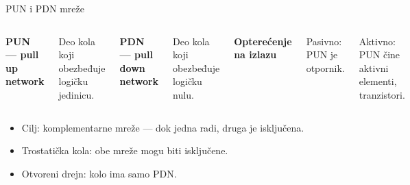 \begin{frame}[label=09_1-s009]{PUN i PDN mreže}\setlength{\parskip}{2pt}\setlength{\abovedisplayskip}{4pt}\setlength{\belowdisplayskip}{4pt}\setlength{\abovedisplayshortskip}{3pt}\setlength{\belowdisplayshortskip}{3pt}
\begin{columns}[T,onlytextwidth]\centering {}\textbf{PUN — pull up network}\par Deo kola koji obezbeđuje logičku jedinicu.
\medskip\par\textbf{PDN — pull down network}\par Deo kola koji obezbeđuje logičku nulu.
\medskip\par\textbf{Opterećenje na izlazu}\par Pasivno: PUN je otpornik.\par Aktivno: PUN čine aktivni elementi, tranzistori.\end{columns}\medskip
\begin{itemize}
\item Cilj: komplementarne mreže — dok jedna radi, druga je isključena.
\item \alert{Trostatička kola}: obe mreže mogu biti isključene.
\item \alert{Otvoreni drejn}: kolo ima samo PDN.
\end{itemize}
\end{frame}
